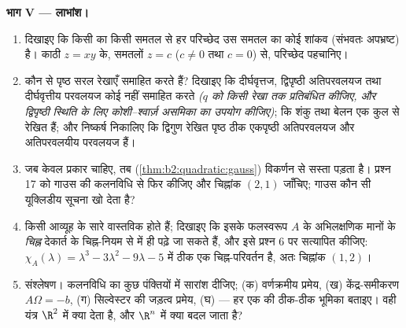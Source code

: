 \begin{problem}[{सप्ताहांत समस्या --- हर द्विघातज पृष्ठ,
वर्णक्रमीय प्रमेय से छाँटा हुआ}]
\medskip
\noindent\textbf{भाग V --- लाभांश।}
\begin{enumerate}[resume]
  \item दिखाइए कि किसी  का किसी  समतल से हर
        परिच्छेद उस समतल का कोई शांकव (संभवतः अपभ्रष्ट) है।
        काठी $z = xy$ के, समतलों $z = c$ ($c \neq 0$ तथा $c = 0$) से, परिच्छेद
        पहचानिए।
  \item कौन से  पृष्ठ सरल रेखाएँ समाहित करते हैं?
        दिखाइए कि दीर्घवृत्तज, द्विपृष्ठी अतिपरवलयज तथा
        दीर्घवृत्तीय परवलयज कोई नहीं समाहित करते \emph{($q$
        को किसी रेखा तक प्रतिबंधित कीजिए, और द्विपृष्ठी
        स्थिति के लिए कोशी--श्वार्ज़ असमिका का उपयोग कीजिए)};
        कि शंकु तथा बेलन एक कुल से रेखित हैं; और निष्कर्ष
        निकालिए कि द्विगुण रेखित  पृष्ठ ठीक एकपृष्ठी
        अतिपरवलयज और अतिपरवलयीय परवलयज हैं।
  \item जब केवल \emph{} प्रकार चाहिए, तब 
        (\cref{thm:b2:quadratic:gauss}) विकर्णन से सस्ता पड़ता है। प्रश्न 17 को गाउस की
        कलनविधि से फिर कीजिए और चिह्नांक $(2, 1)$ जाँचिए; गाउस
        कौन सी यूक्लिडीय सूचना खो देता है?
  \item किसी  आव्यूह के सारे  वास्तविक होते
        हैं; दिखाइए कि इसके फलस्वरूप $A$ के अभिलक्षणिक मानों
        के \emph{चिह्न} देकार्त के चिह्न-नियम से  में ही पढ़े जा सकते हैं, और इसे प्रश्न 6 पर
        सत्यापित कीजिए: $\chi_A(\lambda) = \lambda^3 - 3\lambda^2
        - 9\lambda - 5$ में ठीक एक चिह्न-परिवर्तन है, अतः
        चिह्नांक $(1, 2)$।
  \item संश्लेषण। कलनविधि का कुछ पंक्तियों में सारांश दीजिए;
        (क) वर्णक्रमीय प्रमेय, (ख) केंद्र-समीकरण $A\Omega = -b$, (ग)
        सिल्वेस्टर की जड़त्व प्रमेय, (घ)  --- हर एक
        की ठीक-ठीक भूमिका बताइए। वही यंत्र $\R^2$ में क्या देता
        है, और $\R^n$ में क्या बदल जाता है?
\end{enumerate}
\end{problem}
